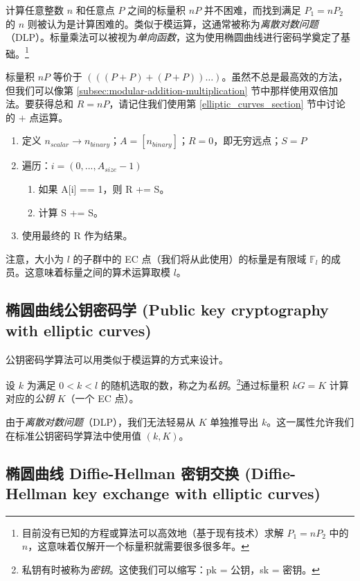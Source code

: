 计算任意整数 $n$ 和任意点 $P$ 之间的标量积 $nP$ 并不困难，而找到满足 $P_1 = n P_2$ 的 $n$ 则被认为是计算困难的。类似于模运算，这通常被称为{\em 离散对数问题}（DLP）。标量乘法可以被视为{\em 单向函数}，这为使用椭圆曲线进行密码学奠定了基础。\footnote{目前没有已知的方程或算法可以高效地（基于现有技术）求解 $P_1 = n P_2$ 中的 $n$，这意味着仅解开一个标量积就需要很多很多年。}

标量积 $nP$ 等价于 $(((P+P)+(P+P))…)$。虽然不总是最高效的方法，但我们可以像第 \ref{subsec:modular-addition-multiplication} 节中那样使用双倍加法。要获得总和 $R = n P$，请记住我们使用第 \ref{elliptic_curves_section} 节中讨论的 $+$ 点运算。

\begin{enumerate}
	\item 定义 $n_{scalar} \rightarrow n_{binary}$；$A = [n_{binary}]$；$R = 0$，即无穷远点；$S = P$
	\item 遍历：$i = (0,...,A_{size} - 1)$
	\begin{enumerate}
		\item 如果 A[i] == 1，则 R += S。
		\item 计算 S += S。
	\end{enumerate}
	\item 使用最终的 R 作为结果。
\end{enumerate}

注意，大小为 $l$ 的子群中的 EC 点（我们将从此使用）的标量是有限域 $\mathbb{F}_l$ 的成员。这意味着标量之间的算术运算取模 $l$。


\subsection{椭圆曲线公钥密码学 (Public key cryptography with elliptic curves)}
\label{ec:keys}
公钥密码学算法可以用类似于模运算的方式来设计。

设 \(k\) 为满足 \(0 < k < l\) 的随机选取的数，称之为{\em 私钥}。\footnote{私钥有时被称为{\em 密钥}。这使我们可以缩写：pk = 公钥，sk = 密钥。}通过标量积 \(k G = K\) 计算对应的{\em 公钥} \(K\)（一个 EC 点）。

由于{\em 离散对数问题}（DLP），我们无法轻易从 \(K\) 单独推导出 \(k\)。这一属性允许我们在标准公钥密码学算法中使用值 \((k, K)\)。


\subsection{椭圆曲线 Diffie-Hellman 密钥交换 (Diffie-Hellman key exchange with elliptic curves)}
\label{DH_exchange_section}


